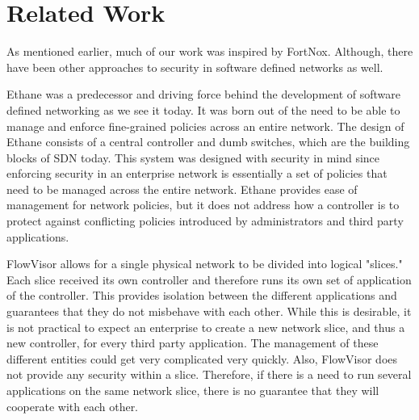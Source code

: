 \section{Related Work}
\label{sec:related}

As mentioned earlier, much of our work was inspired by FortNox. Although, there have been other approaches to security in software defined networks as well.

Ethane \cite{Casado:2007:ETC:1282380.1282382} was a predecessor and driving force behind the development of software defined networking as we see it today.
It was born out of the need to be able to manage and enforce fine-grained policies across an entire network.
The design of Ethane consists of a central controller and dumb switches, which are the building blocks of SDN today.
This system was designed with security in mind since enforcing security in an enterprise network is essentially a set of policies that need to be managed across the entire network.
Ethane provides ease of management for network policies, but it does not address how a controller is to protect against conflicting policies introduced by administrators and third party applications.

FlowVisor \cite{flowvisor} allows for a single physical network to be divided into logical "slices."
Each slice received its own controller and therefore runs its own set of application of the controller.
This provides isolation between the different applications and guarantees that they do not misbehave with each other.
While this is desirable, it is not practical to expect an enterprise to create a new network slice, and thus a new controller, for every third party application.
The management of these different entities could get very complicated very quickly.
Also, FlowVisor does not provide any security within a slice.
Therefore, if there is a need to run several applications on the same network slice, there is no guarantee that they will cooperate with each other.

